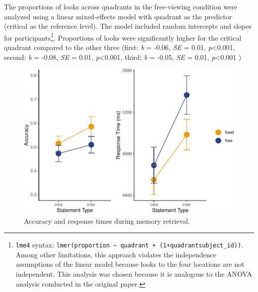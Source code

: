 \documentclass[
  man,floatsintext]{apa6}
\begin{document}
The proportions of looks across quadrants in the free-viewing condition were analyzed using a linear mixed-effects model with quadrant as the predictor (critical as the reference level). The model included random intercepts and slopes for participants\footnote{ \texttt{lme4} syntax: \texttt{lmer(proportion\ \textasciitilde{}\ quadrant\ +\ (1+quadrant\textbar{}subject\_id))}. Among other limitations, this approach violates the independence assumptions of the linear model because looks to the four locations are not independent. This analysis was chosen because it is analogous to the ANOVA analysis conducted in the original paper.}. Proportions of looks were significantly higher for the critical quadrant compared to the other three (first: \emph{b} = -0.06, \emph{SE} = 0.01, \emph{p}\textless0.001, second: \emph{b} = -0.08, \emph{SE} = 0.01, \emph{p}\textless0.001, third: \emph{b} = -0.05, \emph{SE} = 0.01, \emph{p}\textless0.001 )

\begin{figure}
\centering
\includegraphics{manuscript_files/figure-latex/E2-rt-acc-fig-1.pdf}
\caption{\label{fig:E2-rt-acc-fig}Accuracy and response times during memory retrieval.}
\end{figure}
\end{document}
